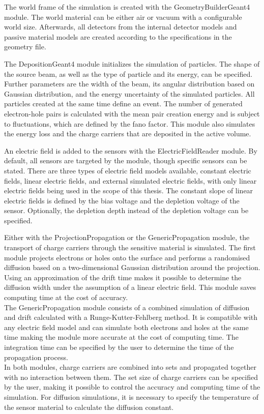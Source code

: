 The world frame of the simulation is created with the GeometryBuilderGeant4 module. The world material can be either air or vacuum with a configurable world size.
Afterwards, all detectors from the internal detector models and passive material models are created according to the specifications in the geometry file.

The DepositionGeant4 module initializes the simulation of particles. The shape of the source beam, as well
as the type of particle and its energy, can be specified. Further parameters are the width of the beam, its angular distribution based on Gaussian distribution, and the energy
uncertainty of the simulated particles. All particles created at the same time define an event. The number of generated electron-hole pairs is calculated with the
mean pair creation energy and is subject to fluctuations, which are defined by the fano factor. This module also simulates the energy loss and the charge carriers that
are deposited in the active volume.

An electric field is added to the sensors with the ElectricFieldReader module. By default, all sensors are targeted by the module, though specific sensors can be stated.
There are three types of electric field models available, constant electric fields, linear electric fields, and external simulated electric fields, with only
linear electric fields being used in the scope of this thesis. The constant slope of linear electric fields is defined by the bias voltage and the
depletion voltage of the sensor. Optionally, the depletion depth instead of the depletion voltage can be specified.

Either with the ProjectionPropagation or the GenericPropagation module, the transport of charge carriers through the sensitive material is simulated.
The first module projects electrons or holes onto the surface and performs a randomised diffusion based on a two-dimensional Gaussian distribution around
the projection. Using an approximation of the drift time makes it possible to determine the diffusion width under the assumption of a linear electric field. This
module saves computing time at the cost of accuracy. \\
The GenericPropagation module consists of a combined simulation of diffusion and drift calculated with a Runge-Kutter-Fehlberg method.
It is compatible with any electric field model and can simulate both electrons and holes
at the same time making the module
more accurate at the cost of computing time. The integration time can be specified by the user to determine the time of the propagation process. \\
In both modules, charge carriers are combined into sets and propagated together with no interaction between them. The set size of charge carriers can be specified by the user,
making it possible to control the accuracy and computing time of the simulation. For diffusion simulations, it is necessary to specify the temperature of the sensor material
to calculate the diffusion constant.

